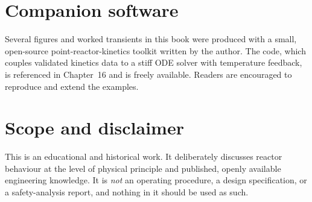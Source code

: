 \section*{Companion software}

Several figures and worked transients in this book were produced with a small,
open-source point-reactor-kinetics toolkit written by the author. The code,
which couples validated kinetics data to a stiff ODE solver with temperature
feedback, is referenced in Chapter~16 and is freely available. Readers are
encouraged to reproduce and extend the examples.

\section*{Scope and disclaimer}

This is an educational and historical work. It deliberately discusses reactor
behaviour at the level of physical principle and published, openly available
engineering knowledge. It is \emph{not} an operating procedure, a design
specification, or a safety-analysis report, and nothing in it should be used as
such.
